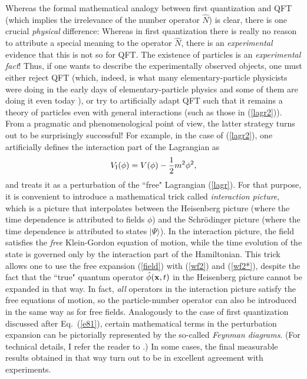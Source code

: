 \documentclass[12pt]{article}
\begin{document}
Whereas the formal mathematical analogy between first quantization and 
QFT (which implies the irrelevance of the number operator $\hat{N}$) 
is clear, 
there is one crucial {\em physical} difference: Whereas in first quantization
there is really no reason to attribute a special meaning 
to the operator $\hat{N}$, there is an {\em experimental} evidence 
that this is not so for QFT. The existence of 
particles is an {\em experimental fact}! Thus, if one wants to describe 
the experimentally observed objects, one must either reject QFT
(which, indeed, is what many elementary-particle physicists were doing 
in the early days of elementary-particle physics and some of them are 
doing it even today \cite{schub}),
or try to artificially adapt QFT such that it 
remains a theory of particles even with general interactions 
(such as those in (\ref{lagr2})). From a pragmatic and phenomenological 
point of view, the latter strategy turns out to be surprisingly 
successful! For example, in the case of (\ref{lagr2}),
one artificially defines the interaction part of the Lagrangian as
\begin{equation}
V_{\rm I}(\phi)=V(\phi)-\frac{1}{2}m^2\phi^2 ,
\end{equation}
and treats it as a perturbation of the ``free" Lagrangian (\ref{lagr}).
For that purpose, it is convenient to introduce a mathematical trick
called {\em interaction picture}, which is
a picture that interpolates between 
the Heisenberg picture (where the time dependence is attributed 
to fields $\phi$) and the Schr\"odinger picture 
(where the time dependence is
attributed to states $|\Psi\rangle$). In the interaction picture,
the field satisfies the {\em free} Klein-Gordon equation of motion,
while the time evolution of the state is governed only by the interaction 
part of the Hamiltonian. This trick allows one to use
the free expansion (\ref{field}) with (\ref{wf2}) and (\ref{wf2*}), 
despite the fact that the ``true" quantum operator $\hat{\phi}({\bf x},t)$
in the Heisenberg picture cannot be expanded in that way.
In fact, {\em all} operators in the interaction picture 
satisfy the free equations of motion, so the particle-number operator
can also be introduced in the same way as for free fields.   
Analogously to the case of first quantization discussed after
Eq.~(\ref{e81}), certain mathematical terms in the perturbation expansion 
can be pictorially represented by the so-called {\em Feynman diagrams}.
(For technical details, I refer the reader to \cite{BD2,cheng}.)
In some cases, the final measurable results obtained in that way turn out 
to be in excellent agreement with experiments. 
\end{document}
